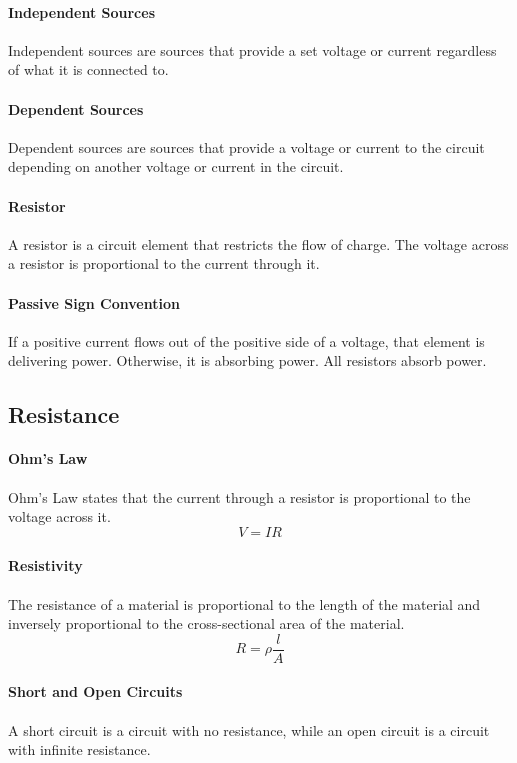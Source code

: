 \documentclass[11pt]{report}
\begin{document}
\paragraph{Independent Sources} Independent sources are sources that provide a set voltage or current regardless of what it is connected to.
\paragraph{Dependent Sources} Dependent sources are sources that provide a voltage or current to the circuit depending on another voltage or current in the circuit.
\paragraph{Resistor} A resistor is a circuit element that restricts the flow of charge. The voltage across a resistor is proportional to the current through it.
\paragraph{Passive Sign Convention} If a positive current flows out of the positive side of a voltage, that element is delivering power. Otherwise, it is absorbing power. All resistors absorb power.
\subsection{Resistance}
\paragraph{Ohm's Law} Ohm's Law states that the current through a resistor is proportional to the voltage across it.
\begin{equation}
    V = IR
\end{equation}
\paragraph{Resistivity} The resistance of a material is proportional to the length of the material and inversely proportional to the cross-sectional area of the material.
\begin{equation}
    R = \rho \frac{l}{A}
\end{equation}
\paragraph{Short and Open Circuits} A short circuit is a circuit with no resistance, while an open circuit is a circuit with infinite resistance.
\end{document}
